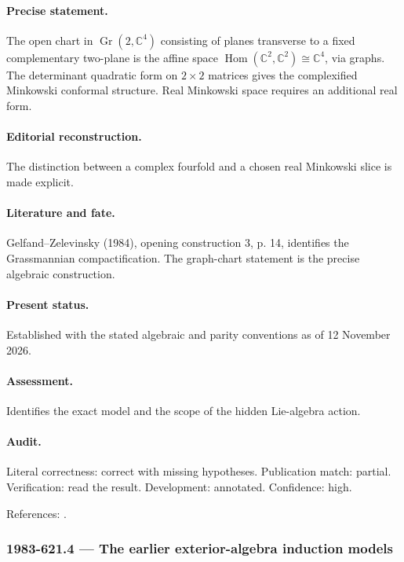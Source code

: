 \paragraph{Precise statement.} The open chart in \(\operatorname{Gr}(2,\mathbb C^4)\) consisting of planes transverse to a fixed complementary two-plane is the affine space \(\operatorname{Hom}(\mathbb C^2,\mathbb C^2)\cong\mathbb C^4\), via graphs. The determinant quadratic form on \(2\times2\) matrices gives the complexified Minkowski conformal structure. Real Minkowski space requires an additional real form.

\paragraph{Editorial reconstruction.} The distinction between a complex fourfold and a chosen real Minkowski slice is made explicit.

\paragraph{Literature and fate.} Gelfand–Zelevinsky (1984), opening construction 3, p. 14, identifies the Grassmannian compactification. The graph-chart statement is the precise algebraic construction.

\paragraph{Present status.} Established with the stated algebraic and parity conventions as of 12 November 2026.

\paragraph{Assessment.} Identifies the exact model and the scope of the hidden Lie-algebra action.

\paragraph{Audit.} Literal correctness: correct with missing hypotheses. Publication match: partial. Verification: read the result. Development: annotated. Confidence: high.

\noindent References: \citep{gelfandzelevinsky1984models}.\par

\subsubsection{1983-621.4 --- The earlier exterior-algebra induction models}

